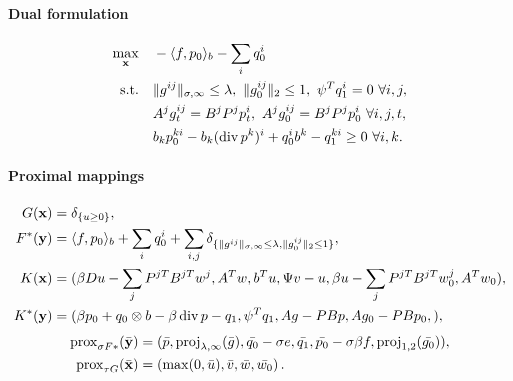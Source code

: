 \paragraph{Dual formulation}
\begin{align*}
    \max_{\mathbf{x}} \quad
        & - \langle f, p_0 \rangle_b - \sum_i q_0^i \\
    \text{s.t.}\quad
        & \|g^{ij}\|_{\sigma,\infty} \leq \lambda,~
          \|g_0^{ij}\|_{2} \leq 1,~
          \psi^T q_1^i = 0 ~\forall i,j, \\
        & A^j g^{ij}_t = B^j P^j p^i_t,~
          A^j g_0^{ij} = B^j P^j p_0^i ~\forall i,j,t, \\
        & b_k p_0^{ki} - b_k (\operatorname{div} p^k)^i + q_0^i b^k - q_1^{ki} \geq 0 ~\forall i, k.
\end{align*}

\paragraph{Proximal mappings}
\begin{align*}
    G(\mathbf{x}) &= \delta_{\{u \geq 0\}}, \\
    F^*(\mathbf{y}) &= \langle f, p_0 \rangle_b + \sum_{i} q_0^i
        + \sum_{i,j} \delta_{\{
            \|g^{ij}\|_{\sigma,\infty} \leq \lambda,
            \|g_0^{ij}\|_{2} \leq 1
        \}}, \\
    K(\mathbf{x}) &= (
        \beta Du - \sum_j P^{jT}B^{jT}w^{j},
        A^T w,
        b^T u,
        \Psi v - u,
        \beta u - \sum_j P^{jT}B^{jT}w_0^{j},
        A^T w_0
    ), \\
    K^*(\mathbf{y}) &= (
        \beta p_0 + q_0 \otimes b - \beta \operatorname{div}{p} - q_1,
        \psi^T q_1,
        A g - PBp,
        A g_0 - PB p_0,
    ),
\end{align*}
\begin{align*}
    \operatorname{prox}_{\sigma F*}(\bar{\mathbf{y}})
    &= (
        \bar{p},
        \operatorname{proj}_{\lambda,\infty}(\bar{g}),
        \bar{q_0}-\sigma e,
        \bar{q_1},
        \bar{p_0} - \sigma \beta f,
        \operatorname{proj}_{1,2}(\bar{g_0})
    ), \\
    \operatorname{prox}_{\tau G}(\bar{\mathbf{x}})
    &= \left(
        \max(0,\bar{u}),
        \bar{v},
        \bar{w},
        \bar{w_0}
    \right).
\end{align*}
